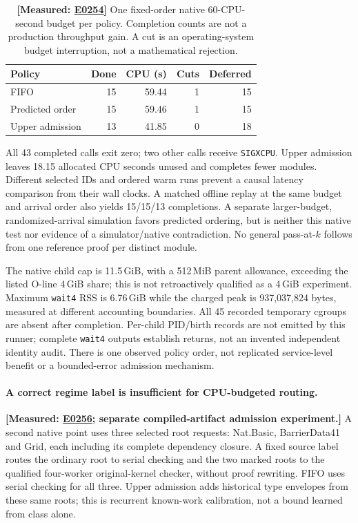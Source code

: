 \documentclass[10pt,twocolumn]{article}
\newcommand{\measured}[1]{\textbf{[Measured: #1]}}
\newcommand{\expref}[2]{\href{https://github.com/yunwei37/proofserve/blob/main/docs/tmp/build-and-evaluate/step-#1/step-report.md}{E#2}}
\begin{document}
\begin{table}[t]
\centering\small
\begin{tabular}{lrrrr}
\toprule
Policy & Done & CPU (s) & Cuts & Deferred\\
\midrule
FIFO &15&59.44&1&15\\
Predicted order &15&59.46&1&15\\
Upper admission &13&41.85&0&18\\
\bottomrule
\end{tabular}
\caption{\measured{\expref{0254-20261101T195608+0000}{0254}} One fixed-order native 60-CPU-second
budget per policy. Completion counts are not a production throughput gain.
A cut is an operating-system budget interruption, not a mathematical rejection.}
\label{tab:admission}
\end{table}

All 43 completed calls exit zero; two other calls receive \texttt{SIGXCPU}.
Upper admission leaves 18.15 allocated CPU seconds unused and completes fewer
modules. Different selected IDs and ordered warm runs prevent a causal
latency comparison from their wall clocks.
A matched offline replay at the same budget and arrival order also yields
15/15/13 completions. A separate larger-budget, randomized-arrival simulation
favors predicted ordering, but is neither this native test nor evidence
of a simulator/native contradiction.
No general pass-at-$k$ follows from one reference proof per distinct module.

The native child cap is 11.5\,GiB, with a 512\,MiB parent allowance,
exceeding the listed O-line 4\,GiB share; this is not retroactively qualified
as a 4\,GiB experiment. Maximum \texttt{wait4} RSS is 6.76\,GiB while the
charged peak is 937,037,824 bytes, measured at different accounting boundaries.
All 45 recorded temporary cgroups are absent after completion.
Per-child PID/birth records are not emitted by this runner; complete
\texttt{wait4} outputs establish returns, not an invented independent
identity audit. There is one observed policy order, not replicated
service-level benefit or a bounded-error admission mechanism.

\paragraph{A correct regime label is insufficient for CPU-budgeted routing.}
\measured{\expref{0256-20261101T205729+0000}{0256}; separate compiled-artifact admission experiment.}
A second native point uses three selected root requests: Nat.Basic,
BarrierData41 and Grid, each including its complete dependency closure.
A fixed source label routes the ordinary root to serial checking and
the two marked roots to the qualified four-worker original-kernel checker,
without proof rewriting. FIFO uses serial checking for all three.
Upper admission adds historical type envelopes from these same roots;
this is recurrent known-work calibration, not a bound learned from class alone.
\end{document}
